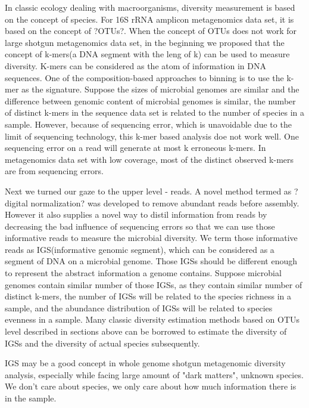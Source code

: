 In classic ecology dealing with macroorganisms, diversity measurement is based on the concept of species. For 16S rRNA amplicon metagenomics data set, it is based on the concept of ?OTUs?. When the concept of OTUs does not work for large shotgun metagenomics data set, in the beginning we proposed that the concept of k-mers(a DNA segment with the leng of k) can be used to measure diversity. K-mers can be considered as the atom of information in DNA sequences. One of the composition-based approaches to binning is to use the k-mer as the signature. Suppose the sizes of microbial genomes are similar and the difference between genomic content of microbial genomes is similar, the number of distinct k-mers in the sequence data set is related to the number of species in a sample. However, because of sequencing error, which is unavoidable due to the limit of sequencing technology, this k-mer based analysis doe not work well. One sequencing error on a read will generate at most k erroneous k-mers. In metagenomics data set with low coverage, most of the distinct observed k-mers are from sequencing errors.




Next we turned our gaze to the upper level - reads. A novel method termed as ?digital normalization? was developed to remove abundant reads before assembly. However it also supplies a novel way to distil information from reads by decreasing the bad influence of sequencing errors so that we can use those informative reads to measure the microbial diversity. We term those informative reads as IGS(informative genomic segment), which can be considered as a segment of DNA on a microbial genome. Those IGSs should be different enough to represent the abstract information a genome contains. Suppose microbial genomes contain similar number of those IGSs, as they contain similar number of distinct k-mers, the number of IGSs will be related to the species richness in a sample, and the abundance distribution of IGSs will be related to species evenness in a sample. Many classic diversity estimation methods based on OTUs level described in sections above can be borrowed to estimate the diversity of IGSs and the diversity of actual species subsequently.

IGS may be a good concept in whole genome shotgun metagenomic diversity analysis, especially while facing large amount of "dark matters", unknown species. We don't care about species, we only care about how much information there is in the sample.


